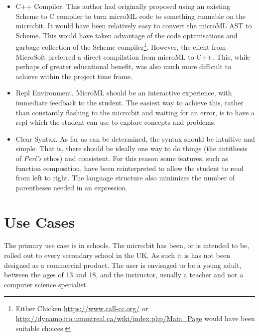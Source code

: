 \documentclass[12pt, a4paper]{report}
\begin{document}
\begin{itemize}
    \item C++ Compiler. This author had originally proposed using an existing Scheme to C compiler
        to turn microML code to something runnable on the micro:bit. It would have been relatively
        easy to convert the microML AST to Scheme. This would have taken advantage of the code
        optimisations and garbage collection of the Scheme compiler\footnote{Either Chicken
        \url{https://www.call-cc.org/} or \url{http://dynamo.iro.umontreal.ca/wiki/index.php/Main_Page} would have been suitable
        choices.}. However, the client from MicroSoft preferred a direct compilation from microML to
        C++. This, while perhaps of greater educational benefit, was also much more difficult to
        achieve within the project time frame. 
    \item Repl Environment. MicroML should be an interactive experience, with immediate feedback to
        the student. The easiest way to achieve this, rather than constantly flashing to the
        micro:bit and waiting for an error, is to have a repl which the student can use to explore
        concepts and problems. 
    \item Clear Syntax. As far as can be determined, the syntax should be intuitive and simple. That
        is, there should be ideally one way to do things (the antithesis of \textit{Perl's} ethos)
        and consistent. For this reason some features, such as function composition, have been
        reinterpreted to allow the student to read from left to right. The language structure also
        minimizes the number of parentheses needed in an expression.
\end{itemize}

\section{Use Cases}
The primary use case is in schools. The micro:bit has been, or is intended to be, rolled
out to every secondary school in the UK\@. As such it is has not been designed as a commercial
product. The user is envisaged to be a young adult, between the ages of 13 and 18, and the
instructor, usually a teacher and not a computer science specialist.
\end{document}
